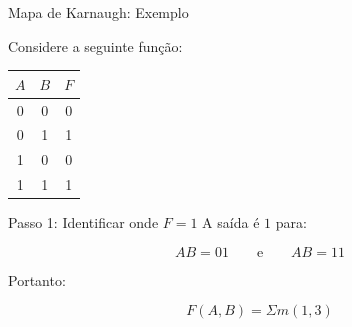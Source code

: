 \begin{frame}{Mapa de Karnaugh: Exemplo}
    \small

    Considere a seguinte função:

    \begin{center}
        \begin{tabular}{c c | c}
            $A$ & $B$ & $F$ \\ \hline
            0 & 0 & 0 \\
            0 & 1 & 1 \\
            1 & 0 & 0 \\
            1 & 1 & 1
        \end{tabular}
    \end{center}

    \begin{block}{Passo 1: Identificar onde $F=1$}
        A saída é $1$ para:

        \[
            AB=01
            \qquad\text{e}\qquad
            AB=11
        \]

        Portanto:

        \[
            F(A,B)=\Sigma m(1,3)
        \]
    \end{block}


\end{frame}